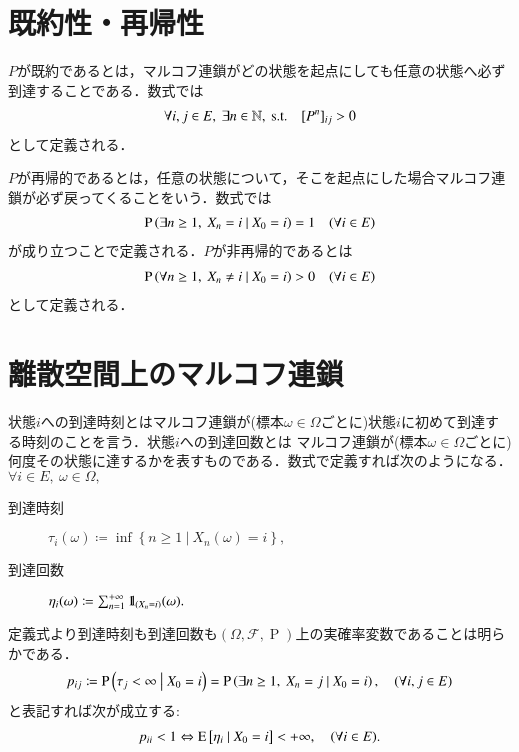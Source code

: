 \section{既約性・再帰性}
	\begin{dfn}[既約性]
		$P$が既約であるとは，マルコフ連鎖がどの状態を起点にしても任意の状態へ必ず到達することである．数式では
		\begin{align}
			\forall i, j \in E,\ \exists n \in \mathbb{N},\ \mathrm{s.t. \quad} [P^n]_{ij} > 0
		\end{align}
		として定義される．
	\end{dfn}
	\begin{dfn}[再帰性]
		$P$が再帰的であるとは，任意の状態について，そこを起点にした場合マルコフ連鎖が必ず戻ってくることをいう．数式では
		\begin{align}
			\operatorname{P} \left( \exists n \geq 1,\ X_n = i \ \middle|\ X_0 = i \right) = 1 \quad(\forall i \in E)
		\end{align}
		が成り立つことで定義される．$P$が非再帰的であるとは
		\begin{align}
			\operatorname{P} \left( \forall n \geq 1,\ X_n \neq i \ \middle|\ X_0 = i \right) > 0 \quad(\forall i \in E)
		\end{align}
		として定義される．
	\end{dfn}
	
\section{離散空間上のマルコフ連鎖}
	\begin{dfn}[到達時刻と到達回数]
		状態$i$への到達時刻とはマルコフ連鎖が(標本$\omega \in \Omega$ごとに)状態$i$に初めて到達する時刻のことを言う．状態$i$への到達回数とは
		マルコフ連鎖が(標本$\omega \in \Omega$ごとに)何度その状態に達するかを表すものである．数式で定義すれば次のようになる．
		$\forall i \in E,\ \omega \in \Omega,$
		\begin{description}
			\item[到達時刻] $\tau_i(\omega) \coloneqq \inf{}{\left\{ n \geq 1\ \left|\ X_n(\omega) = i \right.\right\}},$
			\item[到達回数] $\eta_i(\omega) \coloneqq \sum_{n=1}^{+\infty} \mbox{1}\hspace{-0.25em}\mbox{l}_{(X_n = i)}(\omega).$
		\end{description}
	\end{dfn}
	
	定義式より到達時刻も到達回数も$(\Omega,\mathcal{F},\operatorname{P})$上の実確率変数であることは明らかである．
	\begin{align}
		p_{ij} \coloneqq \operatorname{P} \left( \tau_j < \infty \ \middle|\ X_0 = i \right) = \operatorname{P} \left( \exists n \geq 1,\ X_n = j \ \middle|\ X_0 = i \right), \quad (\forall i,j \in E)
	\end{align}
	と表記すれば次が成立する:
	\begin{align}
		p_{ii} < 1 \Leftrightarrow \operatorname{E} \left[ \eta_i \ \middle|\ X_0 = i \right] < +\infty, \quad (\forall i \in E).
	\end{align}
	
